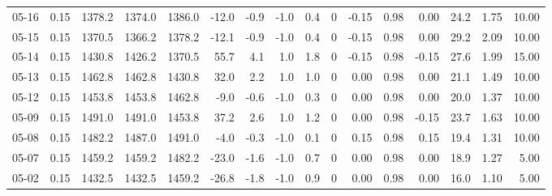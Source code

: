 \begin{threeparttable}
{\begin{tabular}{lrrrrrrrrrrrrrrr}
  05-16 &     0.15 & 1378.2 & 1374.0 & 1386.0 &      -12.0 &           -0.9 &                     -1.0 &                 0.4 &              0 &      -0.15 &      0.98 &           0.00 &             24.2 &            1.75 &                  10.00 \\
  05-15 &     0.15 & 1370.5 & 1366.2 & 1378.2 &      -12.1 &           -0.9 &                     -1.0 &                 0.4 &              0 &      -0.15 &      0.98 &           0.00 &             29.2 &            2.09 &                  10.00 \\
  05-14 &     0.15 & 1430.8 & 1426.2 & 1370.5 &       55.7 &            4.1 &                      1.0 &                 1.8 &              0 &      -0.15 &      0.98 &          -0.15 &             27.6 &            1.99 &                  15.00 \\
  05-13 &     0.15 & 1462.8 & 1462.8 & 1430.8 &       32.0 &            2.2 &                      1.0 &                 1.0 &              0 &       0.00 &      0.98 &           0.00 &             21.1 &            1.49 &                  10.00 \\
  05-12 &     0.15 & 1453.8 & 1453.8 & 1462.8 &       -9.0 &           -0.6 &                     -1.0 &                 0.3 &              0 &       0.00 &      0.98 &           0.00 &             20.0 &            1.37 &                  10.00 \\
  05-09 &     0.15 & 1491.0 & 1491.0 & 1453.8 &       37.2 &            2.6 &                      1.0 &                 1.2 &              0 &       0.00 &      0.98 &          -0.15 &             23.7 &            1.63 &                  10.00 \\
  05-08 &     0.15 & 1482.2 & 1487.0 & 1491.0 &       -4.0 &           -0.3 &                     -1.0 &                 0.1 &              0 &       0.15 &      0.98 &           0.15 &             19.4 &            1.31 &                  10.00 \\
  05-07 &     0.15 & 1459.2 & 1459.2 & 1482.2 &      -23.0 &           -1.6 &                     -1.0 &                 0.7 &              0 &       0.00 &      0.98 &           0.00 &             18.9 &            1.27 &                   5.00 \\
  05-02 &     0.15 & 1432.5 & 1432.5 & 1459.2 &      -26.8 &           -1.8 &                     -1.0 &                 0.9 &              0 &       0.00 &      0.98 &           0.00 &             16.0 &            1.10 &                   5.00 \\

\end{tabular}}
\end{threeparttable}
